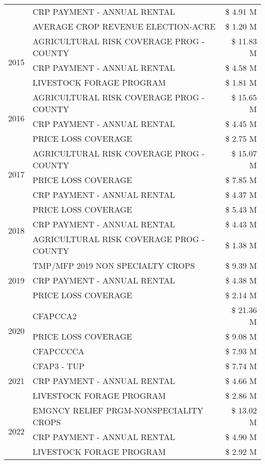 \begin{tabular}{llr}
 & CRP PAYMENT - ANNUAL RENTAL & \$ 4.91 M \\
 & AVERAGE CROP REVENUE ELECTION-ACRE & \$ 1.20 M \\
\cline{1-3}
\multirow[t]{3}{*}{2015} & AGRICULTURAL RISK COVERAGE PROG - COUNTY & \$ 11.83 M \\
 & CRP PAYMENT - ANNUAL RENTAL & \$ 4.58 M \\
 & LIVESTOCK FORAGE PROGRAM & \$ 1.81 M \\
\cline{1-3}
\multirow[t]{3}{*}{2016} & AGRICULTURAL RISK COVERAGE PROG - COUNTY & \$ 15.65 M \\
 & CRP PAYMENT - ANNUAL RENTAL & \$ 4.45 M \\
 & PRICE LOSS COVERAGE & \$ 2.75 M \\
\cline{1-3}
\multirow[t]{3}{*}{2017} & AGRICULTURAL RISK COVERAGE PROG - COUNTY & \$ 15.07 M \\
 & PRICE LOSS COVERAGE & \$ 7.85 M \\
 & CRP PAYMENT - ANNUAL RENTAL & \$ 4.37 M \\
\cline{1-3}
\multirow[t]{3}{*}{2018} & PRICE LOSS COVERAGE & \$ 5.43 M \\
 & CRP PAYMENT - ANNUAL RENTAL & \$ 4.43 M \\
 & AGRICULTURAL RISK COVERAGE PROG - COUNTY & \$ 1.38 M \\
\cline{1-3}
\multirow[t]{3}{*}{2019} & TMP/MFP 2019 NON SPECIALTY CROPS & \$ 9.39 M \\
 & CRP PAYMENT - ANNUAL RENTAL & \$ 4.38 M \\
 & PRICE LOSS COVERAGE & \$ 2.14 M \\
\cline{1-3}
\multirow[t]{3}{*}{2020} & CFAPCCA2 & \$ 21.36 M \\
 & PRICE LOSS COVERAGE & \$ 9.08 M \\
 & CFAPCCCCA & \$ 7.93 M \\
\cline{1-3}
\multirow[t]{3}{*}{2021} & CFAP3 - TUP & \$ 7.74 M \\
 & CRP PAYMENT - ANNUAL RENTAL & \$ 4.66 M \\
 & LIVESTOCK FORAGE PROGRAM & \$ 2.86 M \\
\cline{1-3}
\multirow[t]{3}{*}{2022} & EMGNCY RELIEF PRGM-NONSPECIALITY CROPS & \$ 13.02 M \\
 & CRP PAYMENT - ANNUAL RENTAL & \$ 4.90 M \\
 & LIVESTOCK FORAGE PROGRAM & \$ 2.92 M \\
\cline{1-3}
\bottomrule
\end{tabular}

